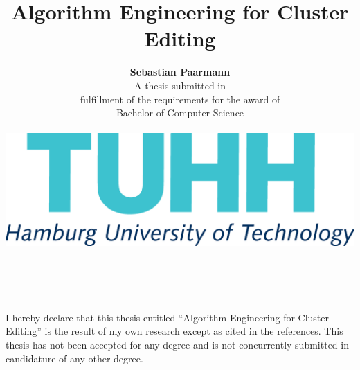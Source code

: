 \documentclass[12pt,oneside,english,parskip=full,headings=small]{scrbook}
\theoremstyle{definition}
\begin{document}
\frontmatter

\vspace{2.5cm}


\title{\textrm{\huge{}Algorithm Engineering for Cluster Editing}\\
	\vspace{1.8cm}
}

\author{\textbf{\LARGE{}Sebastian Paarmann}\vspace{2.5cm}
	\\
	{\normalsize{}A thesis submitted in}\\
	{\normalsize{}fulfillment of the requirements for the award of
	}\\
	{\normalsize{}Bachelor of Computer Science\vspace{3.1cm}
	}\\
	{\normalsize{}}\\
	{\normalsize{}\includegraphics[scale=0.2]{tuhh}}\\
	{\normalsize{}\vspace{3.1cm}
}}

\maketitle

\begin{center}
	$ $\thispagestyle{plain}\vspace{2cm}
\par\end{center}

\begin{center}
	I hereby declare that this thesis entitled \textquotedblleft Algorithm Engineering for Cluster
	Editing\textquotedblright{} is the result of my own
	research except as cited in the references. This thesis has not been
	accepted for any degree and is not concurrently submitted in candidature
	of any other degree. \vspace{2cm}
\par\end{center}
\end{document}
